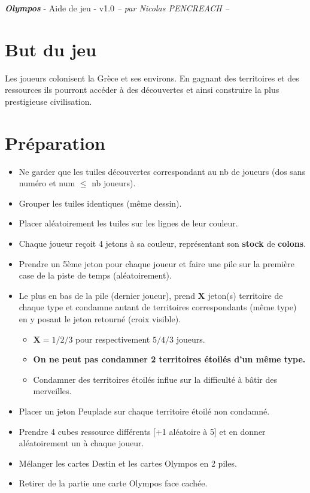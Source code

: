 \documentclass[10pt, a4paper]{article}	%
\begin{document}
{\LARGE \textbf{\textit{Olympos}}}
{\large - Aide de jeu - v1.0}\textit{ -- par Nicolas PENCREACH --}

\setlength{\columnseprule}{0.002cm}	%
\begin{multicols}{3}				%

\section{But du jeu}
Les joueurs colonisent la Grèce et ses environs.
En gagnant des territoires et des ressources ils pourront accéder à des découvertes et ainsi construire la plus prestigieuse civilisation.


\section{Préparation}

\begin{itemize}
\item Ne garder que les tuiles découvertes correspondant au nb de joueurs (dos sans numéro et num $\leq$ nb joueurs).
\item Grouper les tuiles identiques (même dessin).
\item Placer aléatoirement les tuiles sur les lignes de leur couleur.
\item Chaque joueur reçoit 4 jetons à sa couleur, représentant son \textbf{stock} de \textbf{colons}.
\item Prendre un 5ème jeton pour chaque joueur et faire une pile sur la première case de la piste de temps (aléatoirement).
\item Le plus en bas de la pile (dernier joueur), prend \textbf{X} jeton(s) \og territoire\fg{} de chaque type et condamne autant de territoires correspondants (même type) en y posant le jeton retourné (croix visible).
	\begin{itemize}
	\item $\textbf{X} = 1/2/3$ pour respectivement $5/4/3$ joueurs.
	\item \textbf{On ne peut pas condamner 2 territoires étoilés d'un même type.}
	\item Condamner des territoires étoilés influe sur la difficulté à bâtir des merveilles.
	\end{itemize}
\item Placer un jeton \og Peuplade\fg{} sur chaque territoire étoilé non condamné.
\item Prendre 4 cubes \og ressource\fg{} différents [+1 aléatoire à 5] et en donner aléatoirement un à chaque joueur.
\item Mélanger les cartes Destin et les cartes Olympos en 2 piles.
\item Retirer de la partie une carte Olympos face cachée.
\end{itemize}




\end{multicols}
\end{document}
